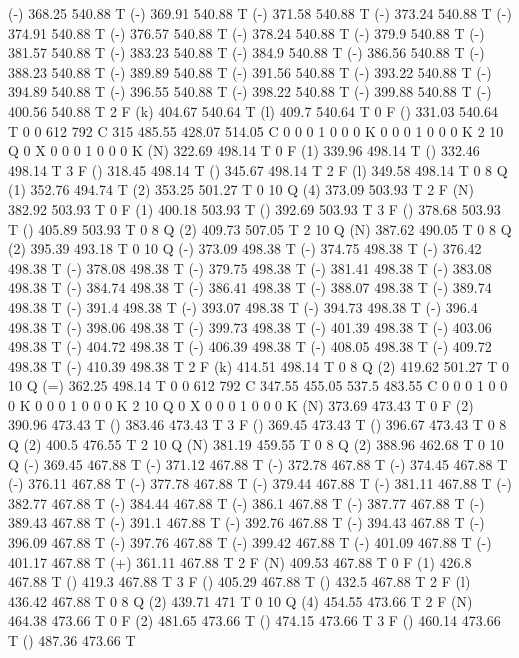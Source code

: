 (-) 368.25 540.88 T
(-) 369.91 540.88 T
(-) 371.58 540.88 T
(-) 373.24 540.88 T
(-) 374.91 540.88 T
(-) 376.57 540.88 T
(-) 378.24 540.88 T
(-) 379.9 540.88 T
(-) 381.57 540.88 T
(-) 383.23 540.88 T
(-) 384.9 540.88 T
(-) 386.56 540.88 T
(-) 388.23 540.88 T
(-) 389.89 540.88 T
(-) 391.56 540.88 T
(-) 393.22 540.88 T
(-) 394.89 540.88 T
(-) 396.55 540.88 T
(-) 398.22 540.88 T
(-) 399.88 540.88 T
(-) 400.56 540.88 T
2 F
(k) 404.67 540.64 T
(l) 409.7 540.64 T
0 F
() 331.03 540.64 T
0 0 612 792 C
315 485.55 428.07 514.05 C
0 0 0 1 0 0 0 K
0 0 0 1 0 0 0 K
2 10 Q
0 X
0 0 0 1 0 0 0 K
(N) 322.69 498.14 T
0 F
(1) 339.96 498.14 T
() 332.46 498.14 T
3 F
() 318.45 498.14 T
() 345.67 498.14 T
2 F
(l) 349.58 498.14 T
0 8 Q
(1) 352.76 494.74 T
(2) 353.25 501.27 T
0 10 Q
(4) 373.09 503.93 T
2 F
(N) 382.92 503.93 T
0 F
(1) 400.18 503.93 T
() 392.69 503.93 T
3 F
() 378.68 503.93 T
() 405.89 503.93 T
0 8 Q
(2) 409.73 507.05 T
2 10 Q
(N) 387.62 490.05 T
0 8 Q
(2) 395.39 493.18 T
0 10 Q
(-) 373.09 498.38 T
(-) 374.75 498.38 T
(-) 376.42 498.38 T
(-) 378.08 498.38 T
(-) 379.75 498.38 T
(-) 381.41 498.38 T
(-) 383.08 498.38 T
(-) 384.74 498.38 T
(-) 386.41 498.38 T
(-) 388.07 498.38 T
(-) 389.74 498.38 T
(-) 391.4 498.38 T
(-) 393.07 498.38 T
(-) 394.73 498.38 T
(-) 396.4 498.38 T
(-) 398.06 498.38 T
(-) 399.73 498.38 T
(-) 401.39 498.38 T
(-) 403.06 498.38 T
(-) 404.72 498.38 T
(-) 406.39 498.38 T
(-) 408.05 498.38 T
(-) 409.72 498.38 T
(-) 410.39 498.38 T
2 F
(k) 414.51 498.14 T
0 8 Q
(2) 419.62 501.27 T
0 10 Q
(=) 362.25 498.14 T
0 0 612 792 C
347.55 455.05 537.5 483.55 C
0 0 0 1 0 0 0 K
0 0 0 1 0 0 0 K
2 10 Q
0 X
0 0 0 1 0 0 0 K
(N) 373.69 473.43 T
0 F
(2) 390.96 473.43 T
() 383.46 473.43 T
3 F
() 369.45 473.43 T
() 396.67 473.43 T
0 8 Q
(2) 400.5 476.55 T
2 10 Q
(N) 381.19 459.55 T
0 8 Q
(2) 388.96 462.68 T
0 10 Q
(-) 369.45 467.88 T
(-) 371.12 467.88 T
(-) 372.78 467.88 T
(-) 374.45 467.88 T
(-) 376.11 467.88 T
(-) 377.78 467.88 T
(-) 379.44 467.88 T
(-) 381.11 467.88 T
(-) 382.77 467.88 T
(-) 384.44 467.88 T
(-) 386.1 467.88 T
(-) 387.77 467.88 T
(-) 389.43 467.88 T
(-) 391.1 467.88 T
(-) 392.76 467.88 T
(-) 394.43 467.88 T
(-) 396.09 467.88 T
(-) 397.76 467.88 T
(-) 399.42 467.88 T
(-) 401.09 467.88 T
(-) 401.17 467.88 T
(+) 361.11 467.88 T
2 F
(N) 409.53 467.88 T
0 F
(1) 426.8 467.88 T
() 419.3 467.88 T
3 F
() 405.29 467.88 T
() 432.5 467.88 T
2 F
(l) 436.42 467.88 T
0 8 Q
(2) 439.71 471 T
0 10 Q
(4) 454.55 473.66 T
2 F
(N) 464.38 473.66 T
0 F
(2) 481.65 473.66 T
() 474.15 473.66 T
3 F
() 460.14 473.66 T
() 487.36 473.66 T
